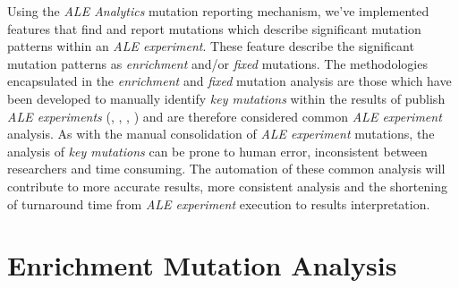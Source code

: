 \documentclass[12pt,final,masters,chapterheads]{ucsd}  %
\begin{document}
Using the \textit{ALE Analytics }mutation reporting mechanism, we've implemented features that find and report mutations which describe significant mutation patterns within an \textit{ALE experiment}. These feature describe the significant mutation patterns as \textit{enrichment} and/or \textit{fixed} mutations. The methodologies encapsulated in the \textit{enrichment} and \textit{fixed} mutation analysis are those which have been developed to manually identify \textit{key mutations} within the results of publish \textit{ALE experiments} (\cite{10.1371/journal.pgen.1001186}, \cite{pmid25015645}, \cite{pmid26964043}, \cite{pmid25304508}) and are therefore considered common \textit{ALE experiment} analysis. As with the manual consolidation of \textit{ALE experiment} mutations, the analysis of \textit{key mutations} can be prone to human error, inconsistent between researchers and time consuming. The automation of these common analysis will contribute to more accurate results, more consistent analysis and the shortening of turnaround time from \textit{ALE experiment} execution to results interpretation.

%
%

\section{Enrichment Mutation Analysis}

%
%

%
%

%
%
\end{document}
